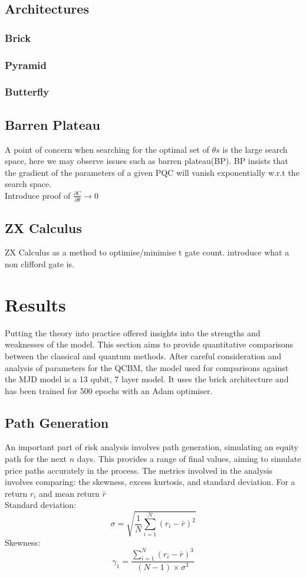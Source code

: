 \documentclass[12pt]{article}
\numberwithin{equation}{section}
\begin{document}
\subsection{Architectures}
\subsubsection{Brick}
\subsubsection{Pyramid}
\subsubsection{Butterfly}

\subsection{Barren Plateau}
A point of concern when searching for the optimal set of $\theta s$ is the large 
search space, here we may observe issues such as barren plateau(BP). BP 
insists that the gradient of the parameters of a given PQC will vanish exponentially 
w.r.t the search space.
\\ 
Introduce proof of $\frac{\partial C}{\partial \theta} \rightarrow 0 $


\subsection{ZX Calculus}
ZX Calculus as a method to optimise/minimise t gate count. introduce what a 
non clifford gate is.


\newpage
\section{Results}
Putting the theory into practice offered insights into the strengths and weaknesses 
of the model. This section aims to provide quantitative comparisons between the 
classical and quantum methods. After careful consideration and analysis of parameters 
for the QCBM, the model used for comparisons against the MJD model is a 13 qubit,
7 layer model. It uses the brick architecture and has been trained for 500 epochs 
with an Adam optimiser. 
\subsection{Path Generation}
An important part of risk analysis involves path generation, simulating an equity 
path for the next $n$ days. This provides a range of final values, aiming to 
simulate price paths accurately in the process. The metrics involved in the analysis 
involves comparing: the skewness, excess kurtosis, and standard deviation. 
For a return $r_i$ and mean return $\bar{r}$ 
\\Standard deviation:
$$
\sigma = \sqrt{\frac{1}{N} \sum_{i=1}^{N} (r_i - \bar{r})^2}
$$
Skewness:
$$
\gamma_1 = \frac{\sum_{i=1}^{N} (r_i - \bar{r})^3}{(N-1) \times \sigma^3}
$$
\end{document}
